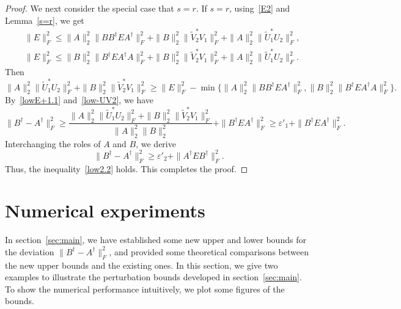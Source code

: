 \documentclass[11pt]{article}
\begin{document}
\begin{proof}
We next consider the special case that $s=r$. If $s=r$, using~\eqref{E2} and Lemma~\ref{s=r}, we get
\begin{align*}
&\|E\|_{F}^{2}\leq\|A\|_{2}^{2}\|BB^{\dagger}EA^{\dagger}\|_{F}^{2}+\|B\|_{2}^{2}\|\widetilde{V}_{2}^{\ast}V_{1}\|_{F}^{2}+\|A\|_{2}^{2}\|\widetilde{U}_{1}^{\ast}U_{2}\|_{F}^{2},\\
&\|E\|_{F}^{2}\leq\|B\|_{2}^{2}\|B^{\dagger}EA^{\dagger}A\|_{F}^{2}+\|B\|_{2}^{2}\|\widetilde{V}_{2}^{\ast}V_{1}\|_{F}^{2}+\|A\|_{2}^{2}\|\widetilde{U}_{1}^{\ast}U_{2}\|_{F}^{2}.
\end{align*}
Then
\begin{equation}\label{low-UV2}
\|A\|_{2}^{2}\|\widetilde{U}_{1}^{\ast}U_{2}\|_{F}^{2}+\|B\|_{2}^{2}\|\widetilde{V}_{2}^{\ast}V_{1}\|_{F}^{2}\geq\|E\|_{F}^{2}-\min\big\{\|A\|_{2}^{2}\|BB^{\dagger}EA^{\dagger}\|_{F}^{2},\|B\|_{2}^{2}\|B^{\dagger}EA^{\dagger}A\|_{F}^{2}\big\}.
\end{equation}
By~\eqref{lowE+1.1} and~\eqref{low-UV2}, we have
\begin{displaymath}
\|B^{\dagger}-A^{\dagger}\|_{F}^{2}\geq\frac{\|A\|_{2}^{2}\|\widetilde{U}_{1}^{\ast}U_{2}\|_{F}^{2}+\|B\|_{2}^{2}\|\widetilde{V}_{2}^{\ast}V_{1}\|_{F}^{2}}{\|A\|_{2}^{2}\|B\|_{2}^{2}}+\|B^{\dagger}EA^{\dagger}\|_{F}^{2}\geq\varepsilon'_{1}+\|B^{\dagger}EA^{\dagger}\|_{F}^{2}.
\end{displaymath}
Interchanging the roles of $A$ and $B$, we derive
\begin{displaymath}
\|B^{\dagger}-A^{\dagger}\|_{F}^{2}\geq\varepsilon'_{2}+\|A^{\dagger}EB^{\dagger}\|_{F}^{2}.
\end{displaymath}
Thus, the inequality~\eqref{low2.2} holds. This completes the proof.
\end{proof}

\section{Numerical experiments}

\label{sec:numer}

\setcounter{equation}{0}

In section~\ref{sec:main}, we have established some new upper and lower bounds for the deviation $\|B^{\dagger}-A^{\dagger}\|_{F}^{2}$, and provided some theoretical comparisons between the new upper bounds and the existing ones. In this section, we give two examples to illustrate the perturbation bounds developed in section~\ref{sec:main}. To show the numerical performance intuitively, we plot some figures of the bounds.
\end{document}
